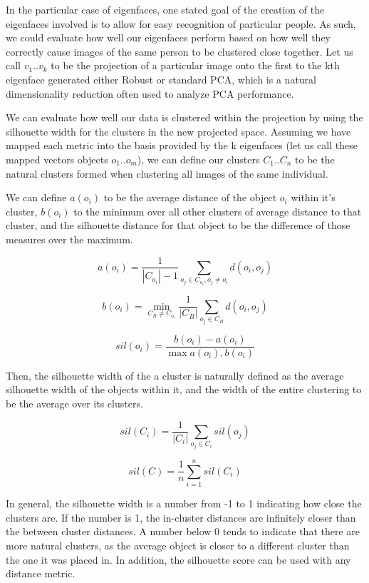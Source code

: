 \documentclass[11pt]{scrartcl} %
\theoremstyle{plain}
\begin{document}
In the particular case of eigenfaces, one stated goal of the creation of the eigenfaces involved is to allow for easy recognition of particular people. As such, we could evaluate how well our eigenfaces perform based on how well they correctly cause images of the same person to be clustered close together. Let us call $v_1 .. v_k$ to be the projection of a particular image onto the first to the kth eigenface generated either Robust or standard PCA, which is a natural dimensionality reduction often used to analyze PCA performance.

We can evaluate how well our data is clustered within the projection by using the silhouette width\cite{silhouette} for the clusters in the new projected space. Assuming we have mapped each metric into the basis provided by the k eigenfaces (let us call these mapped vectors objects $o_1 .. o_m$), we can define our clusters $C_1 .. C_n$ to be the natural clusters formed when clustering all images of the same individual.

We can define $a(o_i)$ to be the average distance of the object $o_i$ within it's cluster, $b(o_i)$ to the minimum over all other clusters of average distance to that cluster, and the silhouette distance for that object to be the difference of those measures over the maximum.

\[
a(o_i) = \frac{1}{|C_{o_i}| - 1} \sum_{o_j \in C_{o_i}, o_j \ne o_i} d(o_i, o_j)
\]

\[
b(o_i) = \min_{C_B \ne C_{o_i}} \frac{1}{|C_B|} \sum_{o_j \in C_B} d(o_i, o_j)
\]

\[
sil(o_i) = \frac{b(o_i) - a(o_i)}{\max{a(o_i), b(o_i)}}
\]

Then, the silhouette width of the a cluster is naturally defined as the average silhouette width of the objects within it, and the width of the entire clustering to be the average over its clusters.
 
\[
sil(C_i) = \frac{1}{|C_i|}\sum_{o_j \in C_i} sil(o_j)
\]

\[
sil(C) = \frac{1}{n}\sum_{i = 1}^{n} sil(C_i)
\]

In general, the silhouette width is a number from -1 to 1 indicating how close the clusters are. If the number is 1, the in-cluster distances are infinitely closer than the between cluster distances. A number below 0 tends to indicate that there are more natural clusters, as the average object is closer to a different cluster than the one it was placed in. In addition, the silhouette score can be used with any distance metric.
\end{document}
